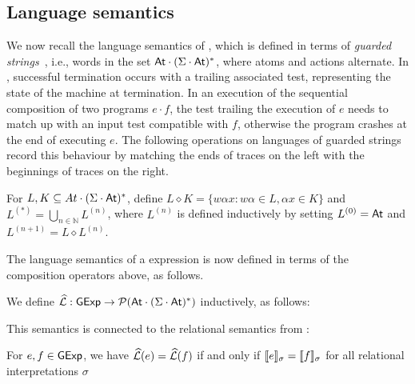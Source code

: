\documentclass[orivec,envcountsect,envcountsame]{llncs}
\begin{document}
\subsection{Language semantics}

We now recall the language semantics of \GKAT, which is defined in terms of \emph{guarded strings}~\cite{katcompleteness}, i.e., words in the set $\mathsf{At} \cdot (\Sigma \cdot \mathsf{At})^*$, where atoms and actions alternate.
In \GKAT, successful termination occurs with a trailing associated test, representing the state of the machine at termination.
In an execution of the sequential composition of two programs \(e \cdot f\), the test trailing the execution of \(e\) needs to match up with an input test compatible with \(f\), otherwise the program crashes at the end of executing \(e\).
The following operations on languages of guarded strings record this behaviour by matching the ends of traces on the left with the beginnings of traces on the right.

\begin{definition}
For $L, K \subseteq At \cdot (\Sigma \cdot \mathsf{At})^*$, define
\(
    L \diamond K = \{ w\alpha{}x : w\alpha \in L, \alpha{}x \in K \}
\) and
\(
    L^{(*)} = \bigcup_{n \in \mathbb{N}} L^{(n)}
\),
where $L^{(n)}$ is defined inductively by setting $L^{(0)} = \mathsf{At}$ and $L^{(n+1)} = L \diamond L^{(n)}$.
\end{definition}

The language semantics of a \GKAT expression is now defined in terms of the composition operators above, as follows.

\begin{definition}
We define $\widehat{\mathcal{L}}: \mathsf{GExp} \to \mathcal{P}(\mathsf{At} \cdot (\Sigma \cdot \mathsf{At})^*)$ inductively, as follows:
\end{definition}

This semantics is connected to the relational semantics from :
\begin{theorem}
For $e, f \in \mathsf{GExp}$, we have $\widehat{\mathcal{L}}(e) = \widehat{\mathcal{L}}(f)$ if and only if $\llbracket e\rrbracket_\sigma = \llbracket f\rrbracket_\sigma$ for all relational interpretations $\sigma$
\end{theorem}
\end{document}
